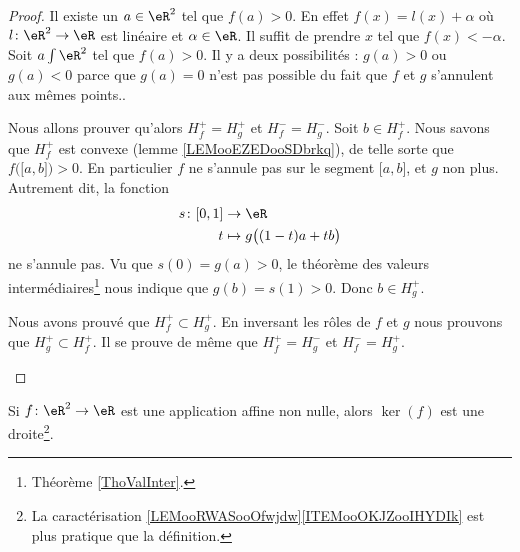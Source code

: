 \begin{proof}
    Il existe un \( a\in \eR^2\) tel que \( f(a)>0\). En effet \( f(x)=l(x)+\alpha\) où \( l\colon \eR^2\to \eR\) est linéaire et \( \alpha\in \eR\). Il suffit de prendre \( x\) tel que \( f(x)<-\alpha\).
    Soit \( a\int \eR^2\) tel que \( f(a)>0\). Il y a deux possibilités : \( g(a)>0\) ou \( g(a)<0\) parce que \( g(a)=0\) n'est pas possible du fait que \( f\) et \( g\) s'annulent aux mêmes points..  

    \begin{subproof}
    \spitem[Si \( g(a)>0\)]
        Nous allons prouver qu'alors \( H^+_f=H^+_g\) et \( H^-_f=H^-_g\). Soit \( b\in H_f^+\). Nous savons que \( H_f^+\) est convexe (lemme \ref{LEMooEZEDooSDbrkq}), de telle sorte que \( f\big( \mathopen[ a , b \mathclose] \big)>0\). En particulier \( f\) ne s'annule pas sur le segment \( \mathopen[ a , b \mathclose]\), et \( g\) non plus. Autrement dit, la fonction
        \begin{equation}
            \begin{aligned}
                s\colon \mathopen[ 0 , 1 \mathclose]&\to \eR \\
                t&\mapsto g\big( (1-t)a+tb \big) 
            \end{aligned}
        \end{equation}
        ne s'annule pas. Vu que \( s(0)=g(a)>0\), le théorème des valeurs intermédiaires\footnote{Théorème \ref{ThoValInter}.} nous indique que \( g(b)= s(1)>0\). Donc \( b\in H_g^+\).

        Nous avons prouvé que \( H_f^+\subset H_g^+\). En inversant les rôles de \( f\) et \( g\) nous prouvons que \( H_g^+\subset H_f^+\).
    \spitem[Si \( g(a)<0\)]
        Il se prouve de même que \( H^+_f=H^-_g\) et \( H^-_f=H^+_g\).
    \end{subproof}
\end{proof}

\begin{proposition}     \label{PROPooSIANooTOKlBI}
    Si \( f\colon \eR^2\to \eR\) est une application affine non nulle, alors \( \ker(f)\) est une droite\footnote{La caractérisation \ref{LEMooRWASooOfwjdw}\ref{ITEMooOKJZooIHYDIk} est plus pratique que la définition.}.
\end{proposition}

